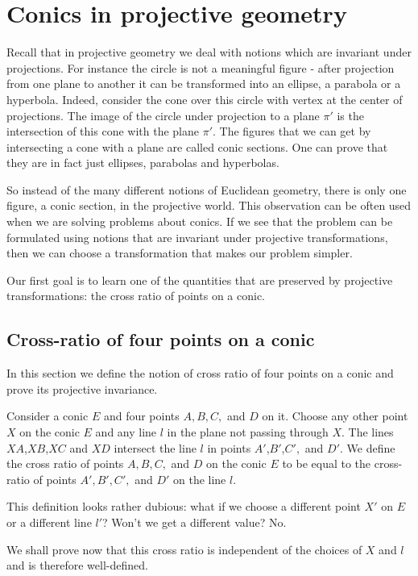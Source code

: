 \chapter{Conics in projective geometry}

Recall that in projective geometry we deal with notions which are invariant under projections. For instance the circle is not a meaningful figure - after projection from one plane to another it can be transformed into an ellipse, a parabola or a hyperbola. Indeed, consider the cone over this circle with vertex at the center of projections. The image of the circle under projection to a plane $\pi'$ is the intersection of this cone with the plane $\pi'$. The figures that we can get by intersecting a cone with a plane are called conic sections. One can prove that they are in fact just ellipses, parabolas and hyperbolas.

So instead of the many different notions of Euclidean geometry, there is only one figure, a conic section, in the projective world. This observation can be often used when we are solving problems about conics. If we see that the problem can be formulated using notions that are invariant under projective transformations, then we can choose a transformation that makes our problem simpler.

Our first goal is to learn one of the quantities that are preserved by projective transformations: the cross ratio of points on a conic.

\section{Cross-ratio of four points on a conic}

In this section we define the notion of cross ratio of four points on a conic and prove its projective invariance.

Consider a conic $E$ and four points $A,B,C,$ and $D$ on it. Choose any other point $X$ on the conic $E$ and any line $l$ in the plane not passing through $X$. The lines $XA$,$XB$,$XC$ and $XD$ intersect the line $l$ in points $A'$,$B'$,$C',$ and $D'$. We define the cross ratio of points $A,B,C,$ and $D$ on the conic $E$ to be equal to the cross-ratio of points $A',B',C',$ and $D'$ on the line $l$.

This definition looks rather dubious: what if we choose a different point $X'$ on $E$ or a different line $l'$? Won't we get a different value? No.

We shall prove now that this cross ratio is independent of the choices of $X$ and $l$ and is therefore well-defined.


